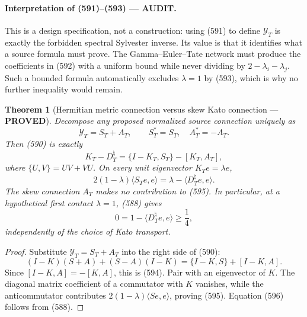 \documentclass[11pt]{article}
\newtheorem{theorem}{Theorem}
\newcommand{\PROVED}{\textcolor{green!45!black}{\textbf{PROVED}}}
\newcommand{\AUDIT}{\textcolor{orange!75!black}{\textbf{AUDIT}}}
\begin{document}
\paragraph{Interpretation of (591)--(593) --- \AUDIT.}
This is a design specification, not a construction: using (591) to define
\(\mathcal Y_T\) is exactly the forbidden spectral Sylvester inverse.
Its value is that it identifies what a source formula must prove.  The
Gamma--Euler--Tate network must produce the coefficients in (592) with a
uniform bound while never dividing by
\(2-\lambda_i-\lambda_j\).  Such a bounded formula automatically excludes
\(\lambda=1\) by (593), which is why no further inequality would remain.

\begin{theorem}[Hermitian metric connection versus skew Kato connection ---
\PROVED]
Decompose any proposed normalized source connection uniquely as
\[
 \mathcal Y_T=S_T+A_T,\qquad S_T^*=S_T,\quad A_T^*=-A_T.
\]
Then (590) is exactly
\begin{equation}
 \boxed{
 K_T-D_T^\natural
 =\{I-K_T,S_T\}-[K_T,A_T],}                           \tag{594}
\end{equation}
where \(\{U,V\}=UV+VU\).  On every unit eigenvector
\(K_Te=\lambda e\),
\begin{equation}
 2(1-\lambda)\langle S_Te,e\rangle
 =\lambda-\langle D_T^\natural e,e\rangle .          \tag{595}
\end{equation}
The skew connection \(A_T\) makes no contribution to (595).  In
particular, at a hypothetical first contact \(\lambda=1\), (588) gives
\begin{equation}
 0=1-\langle D_T^\natural e,e\rangle\ge\frac14,       \tag{596}
\end{equation}
independently of the choice of Kato transport.
\end{theorem}

\begin{proof}
Substitute \(\mathcal Y_T=S_T+A_T\) into the right side of (590):
\[
 (I-K)(S+A)+(S-A)(I-K)
 =\{I-K,S\}+[I-K,A].
\]
Since \([I-K,A]=-[K,A]\), this is (594).  Pair with an eigenvector of
\(K\).  The diagonal matrix coefficient of a commutator with \(K\)
vanishes, while the anticommutator contributes
\(2(1-\lambda)\langle Se,e\rangle\), proving (595).
Equation (596) follows from (588).
\end{proof}
\end{document}
